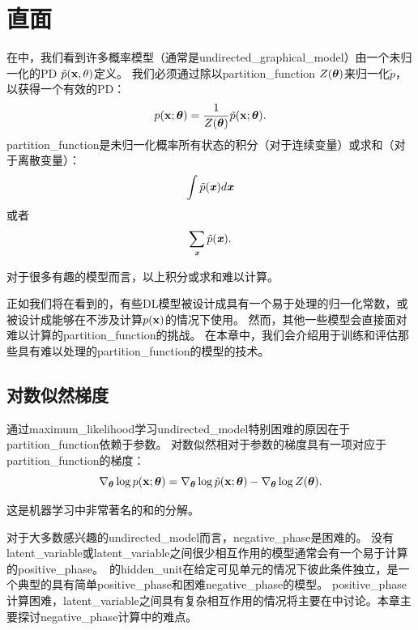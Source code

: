 \chapter{直面}
\label{chap:confronting_the_partition_function}
在中，我们看到许多概率模型（通常是\gls{undirected_graphical_model}）由一个未归一化的\gls{PD} $\tilde{p}(\mathbf{x}, \theta)$定义。
我们必须通过除以\gls{partition_function} $Z(\boldsymbol{\theta})$来归一化$\tilde{p}$，以获得一个有效的\gls{PD}：
\begin{equation}
	p(\mathbf{x}; \boldsymbol{\theta}) = \frac{1}{Z(\boldsymbol{\theta})} \tilde{p}(\mathbf{x}; \boldsymbol{\theta}).
\end{equation}
\gls{partition_function}是未归一化概率所有状态的积分（对于连续变量）或求和（对于离散变量）：
\begin{equation}
	\int \tilde{p}(\boldsymbol{\mathit{x}}) d \boldsymbol{\mathit{x}}
\end{equation}
或者
\begin{equation}
	\sum_{\boldsymbol{\mathit{x}}} \tilde{p} (\boldsymbol{\mathit{x}}).
\end{equation}


对于很多有趣的模型而言，以上积分或求和难以计算。


正如我们将在看到的，有些\gls{DL}模型被设计成具有一个易于处理的归一化常数，或被设计成能够在不涉及计算$p(\mathbf{x})$的情况下使用。
然而，其他一些模型会直接面对难以计算的\gls{partition_function}的挑战。
在本章中，我们会介绍用于训练和评估那些具有难以处理的\gls{partition_function}的模型的技术。


\section{对数似然梯度}
\label{sec:the_log_likelihood_gradient}
通过\gls{maximum_likelihood}学习\gls{undirected_model}特别困难的原因在于\gls{partition_function}依赖于参数。
对数似然相对于参数的梯度具有一项对应于\gls{partition_function}的梯度：
\begin{equation}
	\nabla_{\boldsymbol{\theta}} \log p(\mathbf{x}; \boldsymbol{\theta}) = \nabla_{\boldsymbol{\theta}} \log \tilde{p}(\mathbf{x}; \boldsymbol{\theta}) -
\nabla_{\boldsymbol{\theta}} \log Z(\boldsymbol{\theta}).
\end{equation}

这是机器学习中非常著名的和的分解。


对于大多数感兴趣的\gls{undirected_model}而言，\gls{negative_phase}是困难的。
没有\gls{latent_variable}或\gls{latent_variable}之间很少相互作用的模型通常会有一个易于计算的\gls{positive_phase}。
\,的\gls{hidden_unit}在给定可见单元的情况下彼此条件独立，是一个典型的具有简单\gls{positive_phase}和困难\gls{negative_phase}的模型。
\gls{positive_phase}计算困难，\gls{latent_variable}之间具有复杂相互作用的情况将主要在中讨论。本章主要探讨\gls{negative_phase}计算中的难点。


